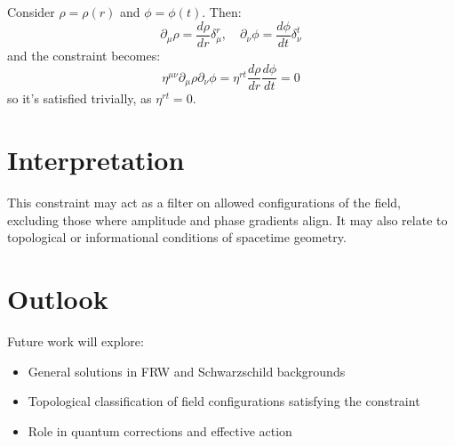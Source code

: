 \documentclass[12pt]{article}
\begin{document}
Consider $\rho = \rho(r)$ and $\phi = \phi(t)$. Then:
\[
\partial_\mu \rho = \frac{d\rho}{dr} \delta^r_\mu, \quad \partial_\nu \phi = \frac{d\phi}{dt} \delta^t_\nu
\]
and the constraint becomes:
\[
\eta^{\mu\nu} \partial_\mu \rho \partial_\nu \phi = \eta^{rt} \frac{d\rho}{dr} \frac{d\phi}{dt} = 0
\]
so it's satisfied trivially, as $\eta^{rt} = 0$.

\section{Interpretation}

This constraint may act as a filter on allowed configurations of the field, excluding those where amplitude and phase gradients align. It may also relate to topological or informational conditions of spacetime geometry.

\section{Outlook}

Future work will explore:
\begin{itemize}
  \item General solutions in FRW and Schwarzschild backgrounds
  \item Topological classification of field configurations satisfying the constraint
  \item Role in quantum corrections and effective action
\end{itemize}
\end{document}
